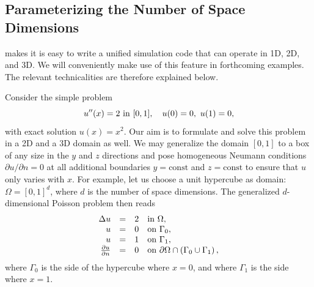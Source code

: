 \subsection{Parameterizing the Number of Space Dimensions}
\label{langtangen:poisson:nD}

\fenics{} makes it is easy to write a unified simulation code that can operate
in 1D, 2D, and 3D. We will conveniently make use of this feature in
forthcoming examples. The relevant technicalities are therefore explained
below.

Consider the simple problem
\begin{equation}
u''(x) = 2\hbox{ in }[0,1],\quad u(0)=0,\ u(1)=0,
\end{equation}
with exact solution $u(x)=x^2$. Our aim is to formulate and solve this
problem in a 2D and a 3D domain as well.
We may generalize the domain $[0,1]$ to a box of any size
in the $y$ and $z$ directions and pose homogeneous Neumann
conditions $\partial u/\partial n = 0$ at all additional boundaries
$y=\mbox{const}$ and $z=\mbox{const}$ to ensure that $u$ only varies with
$x$. For example, let us choose
a unit hypercube as domain: $\Omega = [0,1]^d$, where $d$ is the number
of space dimensions. The generalized $d$-dimensional Poisson problem
then reads
\begin{equation} \label{langtangen:poisson1:ddim}
  \begin{array}{rcll}
    \Delta u &=& 2 &\mbox{in } \Omega, \\
    u &=& 0 &\mbox{on } \Gamma_0,\\
    u &=& 1 &\mbox{on } \Gamma_1,\\
{\partial u\over\partial n} &=& 0 &\mbox{on } \partial\Omega\cap\left(
\Gamma_0\cup\Gamma_1\right),
  \end{array}
\end{equation}
where $\Gamma_0$ is the side of the hypercube where $x=0$, and
where $\Gamma_1$ is the side where $x=1$.

